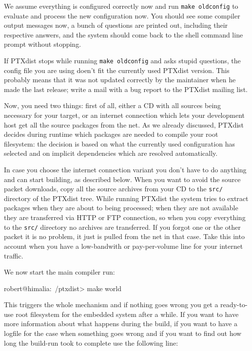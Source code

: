We assume everything is configured correctly now and run \texttt{make
oldconfig} to evaluate and process the new configuration now. You should
see some compiler output messages now, a bunch of questions are printed
out, including their respective answers, and the system should come back
to the shell command line prompt without stopping.

\begin{important}
If PTXdist stops while running \texttt{make oldconfig} and asks stupid
questions, the config file you are using doen't fit the currently used
PTXdist version. This probably means that it was not updated correctly
by the maintainer when he made the last release; write a mail with a bug
report to the PTXdist mailing list. 
\end{important}

Now, you need two things: first of all, either a CD with all sources
being necessary for your target, or an internet connection which lets
your development host get all the source packages from the net. As we
already discussed, PTXdist decides during runtime which packages are
needed to compile your root filesystem: the decision is based on what
the currently used configuration has selected and on implicit
dependencies which are resolved automatically. 

In case you choose the internet connection variant you don't have to do
anything and can start building, as described below. When you want to
avoid the source packet downloads, copy all the source archives from
your CD to the \texttt{src/} directory of the PTXdist tree. While
running PTXdist the system tries to extract packages when they are about
to being processed; when they are not available they are transferred via
HTTP or FTP connection, so when you copy everything to the \texttt{src/}
directory no archives are transferred. If you forgot one or the other
packet it is no problem, it just is pulled from the net in that case.
Take this into account when you have a low-bandwith or pay-per-volume
line for your internet traffic. 

We now start the main compiler run:

\begin{code}
robert@himalia:~/ptxdist> make world
\end{code}

This triggers the whole mechanism and if nothing goes wrong you get a
ready-to-use root filesystem for the embedded system after a while. If
you want to have more information about what happens during the build,
if you want to have a logfile for the case when something goes wrong and
if you want to find out how long the build-run took to complete use the
following line: 

